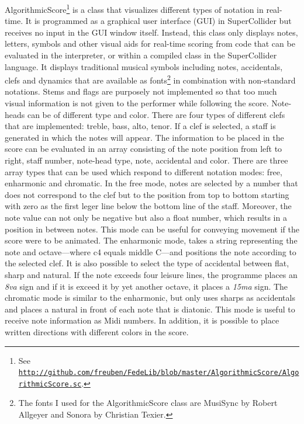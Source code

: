 AlgorithmicScore\footnote{See \href{http://github.com/freuben/FedeLib/blob/master/AlgorithmicScore/AlgorithmicScore.sc} {\texttt{http://github.com/freuben/FedeLib/blob/master/AlgorithmicScore/AlgorithmicScore.sc}}.} is a class that visualizes different types of notation in real-time. It is programmed as a graphical user interface (GUI) in SuperCollider but receives no input in the GUI window itself. Instead, this class only displays notes, letters, symbols and other visual aids for real-time scoring from code that can be evaluated in the interpreter, or within a compiled class in the SuperCollider language. It displays traditional musical symbols including notes, accidentals, clefs and dynamics that are available as fonts\footnote{The fonts I used for the AlgorithmicScore class are MusiSync by Robert Allgeyer and Sonora by Christian Texier.} in combination with non-standard notations. Stems and flags are purposely not implemented so that too much visual information is not given to the performer while following the score. Note-heads can be of different type and color. There are four types of different clefs that are implemented: treble, bass, alto, tenor.  If a clef is selected, a staff is generated in which the notes will appear. The information to be placed in the score can be evaluated in an array consisting of the note position from left to right, staff number, note-head type, note, accidental and color. There are three array types that can be used which respond to different notation modes: free, enharmonic and chromatic. In the free mode, notes are selected by a number that does not correspond to the clef but to the position from top to bottom starting with zero as the first leger line below the bottom line of the staff. Moreover, the note value can not only be negative but also a float number, which results in a position in between notes. This mode can be useful for conveying movement if the score were to be animated. The enharmonic mode, takes a string representing the note and octave---where c4 equals middle C---and positions the note according to the selected clef. It is also possible to select the type of accidental between flat, sharp and natural. If the note exceeds four leisure lines, the programme places an \emph{8va} sign and if it is exceed it by yet another octave, it places a \emph{15ma} sign. The chromatic mode is similar to the enharmonic, but only uses sharps as accidentals and places a natural in front of each note that is diatonic. This mode is useful to receive note information as Midi numbers. In addition, it is possible to place written directions with different colors in the score.

